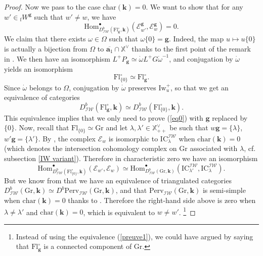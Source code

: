\documentclass[11pt]{amsart}
\theoremstyle{plain}
\theoremstyle{remark}
\numberwithin{equation}{section}
\begin{document}
\begin{proof}
		Now we pass to the case $\mathrm{char}(\mathbf{k})=0$. We want to show that for any $w'\in {_\mathrm{f}W}^\mathbf{g}$ such that $w'\neq w$, we have 
		\begin{equation}\label{eq0}
			\mathrm{Hom}^\bullet_{D^b_{\mathcal{IW}}(\mathrm{Fl}^\circ_{\mathbf{g}},\mathbf{k})}(\mathcal{E}^\mathbf{g}_{w'},\mathcal{E}^\mathbf{g}_w)=0.
		\end{equation}
		We claim that there exists $\omega\in \Omega$ such that $\omega\{0\}=\mathbf{g}$. Indeed, the map $u\mapsto u\{0\}$ is actually a bijection from $\Omega$ to $\overline{\mathbf{a}_1}\cap\mathbb{X}^\vee$ thanks to the first point of the remark in \cite[Ch. VI, §2.3]{cdi_springer_books_10_1007_978_3_540_34491_9}. We then have an isomorphism $L^+P_\mathbf{g}\simeq \dot{\omega}L^+G\dot{\omega}^{-1} $, and conjugation by $\dot{\omega}$ yields an isomorphism
		$$\mathrm{Fl}^\circ_{\{0\}}\simeq \mathrm{Fl}^\circ_{\mathbf{g}}. $$
		Since $\dot{\omega}$ belongs to $\Omega$, conjugation by $\dot{\omega}$ preserves $\mathrm{Iw}_u^+$, so that we get an equivalence of categories \begin{equation}\label{preuve1}
		    D^b_{\mathcal{IW}}(\mathrm{Fl}^\circ_{\mathbf{g}},\mathbf{k})\simeq D^b_{\mathcal{IW}}(\mathrm{Fl}^\circ_{\{0\}},\mathbf{k}).
		\end{equation} This equivalence implies that we only need to prove (\ref{eq0}) with $\mathbf{g}$ replaced by $\{0\}$. Now, recall that $\mathrm{Fl}_{\{0\}}\simeq\mathrm{Gr}$ and let $\lambda,\lambda'\in\mathbb{X}^\vee_{++}$ be such that $w\mathbf{g}=\{\lambda\}$, $w'\mathbf{g}=\{\lambda'\}$. By \cite[Remark 3.5]{JEP_2019__6__707_0}, the complex $\mathcal{E}_w$ is isomorphic to $\mathrm{IC}^{\mathcal{IW}}_{\lambda}$ when $\mathrm{char}(\mathbf{k})=0$ (which denotes the intersection cohomology complex on $\mathrm{Gr}$ associated with $\lambda$, cf. subsection \ref{IW variant}). Therefore in characteristic zero we have an isomorphism 
		$$\mathrm{Hom}^\bullet_{D^b_{\mathcal{IW}}(\mathrm{Fl}^\circ_{\{0\}},\mathbf{k})}(\mathcal{E}_{w'},\mathcal{E}_w)\simeq \mathrm{Hom}^\bullet_{D^b_{\mathcal{IW}}(\mathrm{Gr},\mathbf{k})}(\mathrm{IC}^{\mathcal{IW}}_{\lambda'},\mathrm{IC}^{\mathcal{IW}}_{\lambda}).$$
		But we know from \cite[§3.2]{JEP_2019__6__707_0} that we have an equivalence of triangulated categories $D^b_{\mathcal{IW}}(\mathrm{Gr},\mathbf{k})\simeq D^b\mathrm{Perv}_{\mathcal{IW}}(\mathrm{Gr},\mathbf{k})$, and that $\mathrm{Perv}_{\mathcal{IW}}(\mathrm{Gr},\mathbf{k})$ is semi-simple when $\mathrm{char}(\mathbf{k})=0$ thanks to \cite[Corollary 3.6]{JEP_2019__6__707_0}. Therefore the right-hand side above is zero when $\lambda\neq\lambda'$ and $\mathrm{char}(\mathbf{k})=0$, which is equivalent to $w\neq w'$. \footnote{Instead of using the equivalence (\ref{preuve1}), we could have argued by saying that $\mathrm{Fl}^\circ_{\mathbf{g}}$ is a connected component of $\mathrm{Gr}$.}\end{proof}
\end{document}
